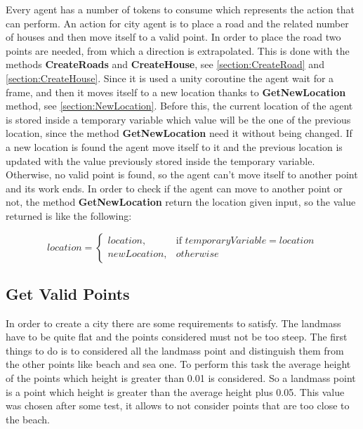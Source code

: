 \documentclass[12pt]{article}
\begin{document}
    Every agent has a number of tokens to consume which represents the action that can perform. An action for city agent is to place a road and the related number of
    houses and then move itself to a valid point. In order to place the road two points are needed, from which a direction is extrapolated. This is done with the methods
    \textbf{CreateRoads} and \textbf{CreateHouse}, see \ref{section:CreateRoad} and \ref{section:CreateHouse}. Since it is used a unity coroutine the agent wait for a frame, and then 
    it moves itself to a new location thanks to \textbf{GetNewLocation} method, see \ref{section:NewLocation}. Before this, the current location of the agent
    is stored inside a temporary variable which value will be the one of the previous location, since the method \textbf{GetNewLocation} need it without being changed.
    If a new location is found the agent move itself to it and the previous location is updated with the value previously stored inside the temporary variable. Otherwise,
    no valid point is found, so the agent can't move itself to another point and its work ends. In order to check if the agent can move to another point or not, the 
    method \textbf{GetNewLocation} return the location given input, so the value returned is like the following:

    \begin{equation}
        location = \begin{cases} location, & \mbox{if } temporaryVariable { = location} \\ newLocation, & \mbox{} otherwise\  \end{cases}
    \end{equation}

    \subsection{Get Valid Points} \label{section: ValidPoints}
    In order to create a city there are some requirements to satisfy. The landmass have to be quite flat and the points considered must not be too steep.
    The first things to do is to considered all the landmass point and distinguish them from the other points like beach and sea one. To perform this task the
    average height of the points which height is greater than 0.01 is considered. So a landmass point is a point which height is greater than the average height plus
    0.05. This value was chosen after some test, it allows to not consider points that are too close to the beach. 
\end{document}
